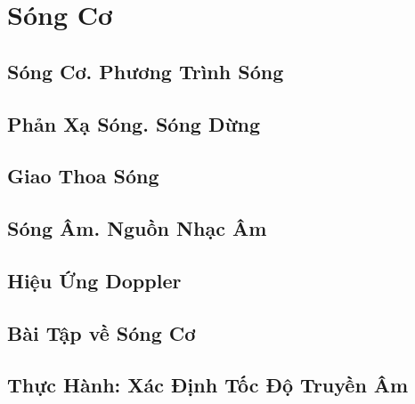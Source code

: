 \documentclass{article}
\numberwithin{equation}{section}
\begin{document}
\section{Sóng Cơ}

\subsection{Sóng Cơ. Phương Trình Sóng}


\subsection{Phản Xạ Sóng. Sóng Dừng}


\subsection{Giao Thoa Sóng}


\subsection{Sóng Âm. Nguồn Nhạc Âm}


\subsection{Hiệu Ứng Doppler}


\subsection{Bài Tập về Sóng Cơ}


\subsection{Thực Hành: Xác Định Tốc Độ Truyền Âm}
\end{document}
